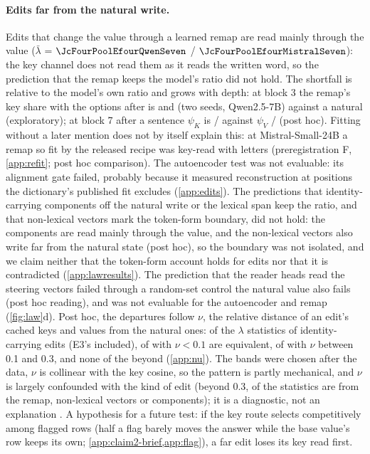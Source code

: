 \paragraph{Edits far from the natural write.}
Edits that change the value through a learned remap are read mainly through the value ($\bar\lambda$ = $\JcFourPoolEfourQwenSeven$ / $\JcFourPoolEfourMistralSeven$): the key channel does not read them as it reads the written word, so the prediction\rsk{} that the remap keeps the model's ratio did not hold. The shortfall is relative to the model's own ratio and grows with depth: at block 3 the remap's key share with the options after is \JcKappaEfouraOptThreeQwenSeven{} and \JcKappaEfourbOptThreeQwenSeven{} (two seeds, Qwen2.5-7B) against a natural \JcSigmaOptThreeQwenSeven{} (exploratory); at block 7 after a sentence $\psi_K$ is \JcFourPsiKWpostSevenQwenSeven{} / \JcFourPsiKWpostSevenMistralSeven{} against $\psi_V$ \JcFourPsiVWpostSevenQwenSeven{} / \JcFourPsiVWpostSevenMistralSeven{} (post hoc). Fitting without a later mention does not by itself explain this: at Mistral-Small-24B a remap so fit by the released recipe was key-read with letters (preregistration F, \cref{app:refit}; post hoc comparison). The autoencoder test\rsk{} was not evaluable: its alignment gate failed, probably because it measured reconstruction at positions the dictionary's published fit excludes (\cref{app:edits}). The predictions\rsk{} that identity-carrying components off the natural write or the lexical span keep the ratio, and that non-lexical vectors mark the token-form boundary, did not hold: the components are read mainly through the value, and the non-lexical vectors also write far from the natural state (post hoc), so the boundary was not isolated, and we claim neither that the token-form account holds for edits nor that it is contradicted (\cref{app:lawresults}). The prediction that the reader heads read the steering vectors failed through a random-set control the natural value also fails (post hoc reading), and was not evaluable\rsk{} for the autoencoder and remap (\cref{fig:law}d). Post hoc, the departures follow $\nu$, the relative distance of an edit's cached keys and values from the natural ones: of the $\lambda$ statistics of identity-carrying edits (E3's included), \JcNuEqLow{} of \JcNuNLow{} with $\nu < 0.1$ are equivalent, \JcNuEqMid{} of \JcNuNMid{} with $\nu$ between 0.1 and 0.3, and none of the \JcNuNHigh{} beyond (\cref{app:nu}). The bands were chosen after the data, $\nu$ is collinear with the key cosine, so the pattern is partly mechanical, and $\nu$ is largely confounded with the kind of edit (beyond 0.3, \JcNuOtherAbove{} of the \JcNuNHigh{} statistics are from the remap, non-lexical vectors or components); it is a diagnostic, not an explanation \citep{liu2026wrong}. A hypothesis for a future test: if the key route selects competitively among flagged rows (half a flag barely moves the answer while the base value's row keeps its own; \cref{app:claim2-brief,app:flag}), a far edit loses its key read first.

